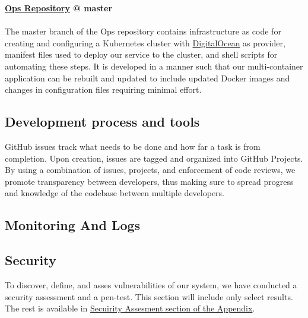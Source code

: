\textbf{\hyperref[app:opsRepo]{Ops Repository} @ master}\\\\
The master branch of the Ops repository contains infrastructure as code for creating and configuring a Kubernetes cluster with \href{https://www.digitalocean.com/}{DigitalOcean} as provider, manifest files used to deploy our service to the cluster, and shell scripts for automating these steps. It is developed in a manner such that our multi-container application can be rebuilt and updated to include updated Docker images and changes in configuration files requiring minimal effort.

\subsection{Development process and tools}
\label{subsec:process&tools}
GitHub issues track what needs to be done and how far a task is from completion. Upon creation, issues are tagged and organized into GitHub Projects. By using a combination of issues, projects, and enforcement of code reviews, we promote transparency between developers, thus making sure to spread progress and knowledge of the codebase between multiple developers.

\subsection{Monitoring And Logs}
\label{subsec:monitoring}

\subsection{Security}
\label{subsec:security}
To discover, define, and asses vulnerabilities of our system, we have conducted a security assessment and a pen-test. This section will include only select results. The rest is available in \hyperref[app:secAss]{Secuirity Assesment section of the Appendix}.

